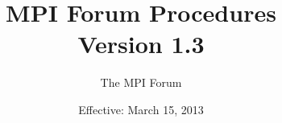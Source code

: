 \documentclass{book}
\begin{document}
\title{MPI Forum Procedures \\
Version 1.3}
\author{The MPI Forum}
\date{Effective: March 15, 2013}
\maketitle






\end{document}
